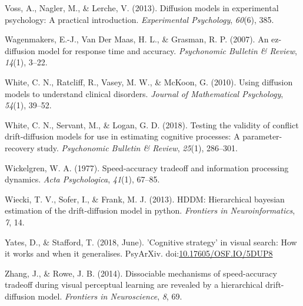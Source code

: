 \documentclass[floatsintext,doc]{apa6}
\theoremstyle{definition}
\theoremstyle{definition}
\theoremstyle{definition}
\theoremstyle{remark}
\begin{document}
\hypertarget{ref-voss2013diffusion}{}
Voss, A., Nagler, M., \& Lerche, V. (2013). Diffusion models in
experimental psychology: A practical introduction. \emph{Experimental
Psychology}, \emph{60}(6), 385.

\hypertarget{ref-wagenmakers2007ez}{}
Wagenmakers, E.-J., Van Der Maas, H. L., \& Grasman, R. P. (2007). An
ez-diffusion model for response time and accuracy. \emph{Psychonomic
Bulletin \& Review}, \emph{14}(1), 3--22.

\hypertarget{ref-white2010using}{}
White, C. N., Ratcliff, R., Vasey, M. W., \& McKoon, G. (2010). Using
diffusion models to understand clinical disorders. \emph{Journal of
Mathematical Psychology}, \emph{54}(1), 39--52.

\hypertarget{ref-white2018testing}{}
White, C. N., Servant, M., \& Logan, G. D. (2018). Testing the validity
of conflict drift-diffusion models for use in estimating cognitive
processes: A parameter-recovery study. \emph{Psychonomic Bulletin \&
Review}, \emph{25}(1), 286--301.

\hypertarget{ref-wickelgren1977speed}{}
Wickelgren, W. A. (1977). Speed-accuracy tradeoff and information
processing dynamics. \emph{Acta Psychologica}, \emph{41}(1), 67--85.

\hypertarget{ref-wiecki2013hddm}{}
Wiecki, T. V., Sofer, I., \& Frank, M. J. (2013). HDDM: Hierarchical
bayesian estimation of the drift-diffusion model in python.
\emph{Frontiers in Neuroinformatics}, \emph{7}, 14.

\hypertarget{ref-yates_stafford_2018}{}
Yates, D., \& Stafford, T. (2018, June). 'Cognitive strategy' in visual
search: How it works and when it generalises. PsyArXiv.
doi:\href{https://doi.org/10.17605/OSF.IO/5DUP8}{10.17605/OSF.IO/5DUP8}

\hypertarget{ref-zhang2014dissociable}{}
Zhang, J., \& Rowe, J. B. (2014). Dissociable mechanisms of
speed-accuracy tradeoff during visual perceptual learning are revealed
by a hierarchical drift-diffusion model. \emph{Frontiers in
Neuroscience}, \emph{8}, 69.
\end{document}
